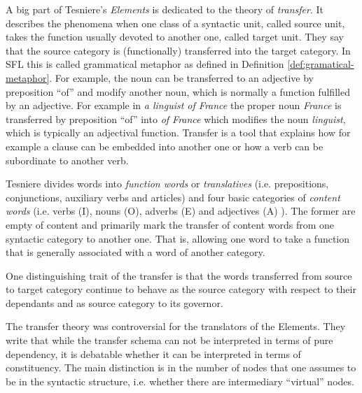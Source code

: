     
    A big part of Tesniere's \textit{Elements} \citep{Tesniere59} is dedicated to the theory of \textit{transfer}. It describes the phenomena when one class of a syntactic unit, called source unit, takes the function  usually devoted to another one, called target unit. They say that the source category is (functionally) transferred into the target category. In SFL this is called grammatical metaphor as defined in Definition \ref{def:gramatical-metaphor}. For example, the noun can be transferred to an adjective by preposition ``of'' and modify another noun, which is normally a function fulfilled by an adjective. For example in \textit{a linguist of France} the proper noun \textit{France} is transferred by preposition ``of'' into \textit{of France} which modifies the noun \textit{linguist}, which is typically an adjectival function. Transfer is a tool that explains how for example a clause can be embedded into another one or how a verb can be subordinate to another verb. 

    Tesniere divides words into \textit{function words} or \textit{translatives} (i.e. prepositions, conjunctions, auxiliary verbs and articles) and four basic categories of \textit{content words} (i.e. verbs (I), nouns (O), adverbs (E) and adjectives (A) ). The former are empty of content and primarily mark the transfer of content words from one syntactic category to another one. That is, allowing one word to take a function that is generally associated with a word of another category.
    
    One distinguishing trait of the transfer is that the words transferred from source to target category continue to behave as the source category with respect to their dependants and as source category to its governor.

    The transfer theory was controversial for the translators of the Elements. They write \citep[liv-lx]{Tesniere2015} that while the transfer schema can not be interpreted in terms of pure dependency, it is debatable whether it can be interpreted in terms of constituency. The main distinction is in the number of nodes that one assumes to be in the syntactic structure, i.e. whether there are intermediary ``virtual'' nodes. 

